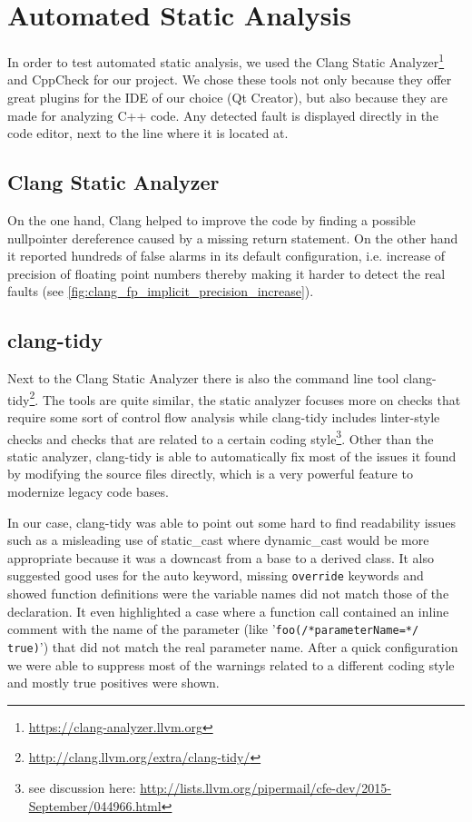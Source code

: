 \documentclass{scrreprt}
\begin{document}
\section{Automated Static Analysis}

In order to test automated static analysis, we used the Clang Static Analyzer\footnote{\url{https://clang-analyzer.llvm.org}} and CppCheck for our project. We chose these tools not only because they offer great plugins for the IDE of our choice (Qt Creator), but also because they are made for analyzing C++ code. Any detected fault is displayed directly in the code editor, next to the line where it is located at.

\subsection{Clang Static Analyzer} On the one hand, Clang helped to improve the code by finding a possible nullpointer dereference caused by a missing return statement. On the other hand it reported hundreds of false alarms in its default configuration, i.e. increase of precision of floating point numbers thereby making it harder to detect the real faults (see \vref{fig:clang_fp_implicit_precision_increase}).

\subsection{clang-tidy} Next to the Clang Static Analyzer there is also the command line tool clang-tidy\footnote{\url{http://clang.llvm.org/extra/clang-tidy/}}. The tools are quite similar, the static analyzer focuses more on checks that require some sort of control flow analysis while clang-tidy includes linter-style checks and checks that are related to a certain coding style\footnote{see discussion here: \url{http://lists.llvm.org/pipermail/cfe-dev/2015-September/044966.html}}. Other than the static analyzer, clang-tidy is able to automatically fix most of the issues it found by modifying the source files directly, which is a very powerful feature to modernize legacy code bases.

In our case, clang-tidy was able to point out some hard to find readability issues such as a misleading use of static\_cast where dynamic\_cast would be more appropriate because it was a downcast from a base to a derived class. It also suggested good uses for the auto keyword, missing \texttt{override} keywords and showed function definitions were the variable names did not match those of the declaration. It even highlighted a case where a function call contained an inline comment with the name of the parameter (like '\texttt{foo(/*parameterName=*/ true)}') that did not match the real parameter name. After a quick configuration we were able to suppress most of the warnings related to a different coding style and mostly true positives were shown.
\end{document}
